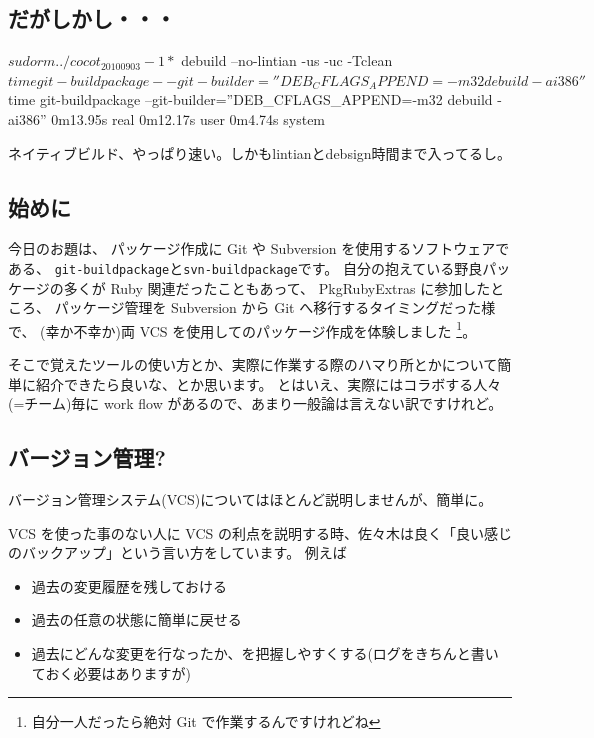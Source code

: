 \documentclass[mingoth,a4paper]{jsarticle}
\begin{document}
\subsection{だがしかし・・・}
\begin{commandline}
$ sudo rm ../cocot_20100903-1*
$ debuild --no-lintian -us -uc -Tclean
$ time git-buildpackage --git-builder=''DEB_CFLAGS_APPEND=-m32 debuild -ai386''
$ time git-buildpackage --git-builder=''DEB_CFLAGS_APPEND=-m32 debuild -ai386''
    0m13.95s real     0m12.17s user     0m4.74s system
\end{commandline}
ネイティブビルド、やっぱり速い。しかもlintianとdebsign時間まで入ってるし。


\subsection{始めに}

今日のお題は、
パッケージ作成に Git や Subversion を使用するソフトウェアである、
{\tt{git-buildpackage}}と{\tt{svn-buildpackage}}です。
自分の抱えている野良パッケージの多くが Ruby 関連だったこともあって、
PkgRubyExtras に参加したところ、
パッケージ管理を Subversion から Git へ移行するタイミングだった様で、
(幸か不幸か)両 VCS を使用してのパッケージ作成を体験しました%
\footnote{自分一人だったら絶対 Git で作業するんですけれどね}。

そこで覚えたツールの使い方とか、実際に作業する際のハマり所とかについて簡単に紹介できたら良いな、とか思います。
とはいえ、実際にはコラボする人々(=チーム)毎に work flow があるので、あまり一般論は言えない訳ですけれど。

\subsection{バージョン管理?}

バージョン管理システム(VCS)についてはほとんど説明しませんが、簡単に。

VCS を使った事のない人に VCS の利点を説明する時、佐々木は良く「良い感じのバックアップ」という言い方をしています。
例えば
\begin{itemize}
\item 過去の変更履歴を残しておける
\item 過去の任意の状態に簡単に戻せる
\item 過去にどんな変更を行なったか、を把握しやすくする(ログをきちんと書いておく必要はありますが)
\end{itemize}
\end{document}
